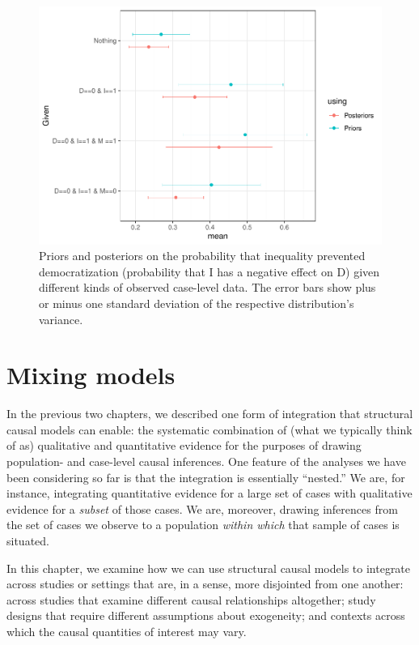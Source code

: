 \documentclass[
  12pt,
]{book}
\begin{document}
\begin{figure}
\centering
\includegraphics{ii_files/figure-latex/dprevented-1.pdf}
\caption{\label{fig:dprevented}Priors and posteriors on the probability that inequality prevented democratization (probability that I has a negative effect on D) given different kinds of observed case-level data. The error bars show plus or minus one standard deviation of the respective distribution's variance.}
\end{figure}

\hypertarget{mm}{%
\chapter{Mixing models}\label{mm}}

In the previous two chapters, we described one form of integration that structural causal models can enable: the systematic combination of (what we typically think of as) qualitative and quantitative evidence for the purposes of drawing population- and case-level causal inferences. One feature of the analyses we have been considering so far is that the integration is essentially ``nested.'' We are, for instance, integrating quantitative evidence for a large set of cases with qualitative evidence for a \emph{subset} of those cases. We are, moreover, drawing inferences from the set of cases we observe to a population \emph{within which} that sample of cases is situated.

In this chapter, we examine how we can use structural causal models to integrate across studies or settings that are, in a sense, more disjointed from one another: across studies that examine different causal relationships altogether; study designs that require different assumptions about exogeneity; and contexts across which the causal quantities of interest may vary.
\end{document}
